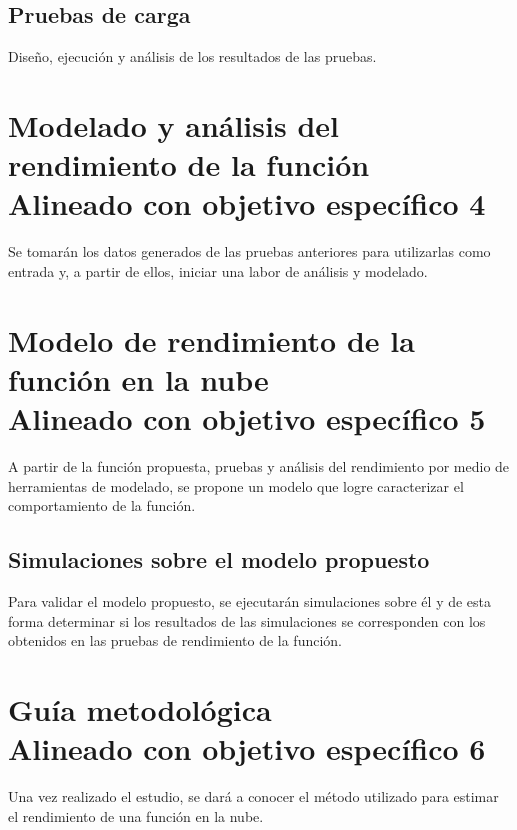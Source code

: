 \subsection{Pruebas de carga}
Diseño, ejecución y análisis de los resultados de las pruebas.




\section[Modelado y análisis del rendimiento de la función]{Modelado y análisis del rendimiento de la función\\\small{Alineado con objetivo específico 4}}
Se tomarán los datos generados de las pruebas anteriores para utilizarlas como entrada y, a partir de ellos, iniciar una labor de análisis y modelado.

\section[Modelo de rendimiento de la función en la nube]{Modelo de rendimiento de la función en la nube\\\small{Alineado con objetivo específico 5}}
A partir de la función propuesta, pruebas y análisis del rendimiento por medio de herramientas de modelado, se propone un modelo que logre caracterizar el comportamiento de la función.

\subsection[Simulaciones sobre el modelo propuesto]{Simulaciones sobre el modelo propuesto}
Para validar el modelo propuesto, se ejecutarán simulaciones sobre él y de esta forma determinar si los resultados de las simulaciones se corresponden con los obtenidos en las pruebas de rendimiento de la función.

\section[Guía metodológica]{Guía metodológica\\\small{Alineado con objetivo específico 6}}
Una vez realizado el estudio, se dará a conocer el método utilizado para estimar el rendimiento de una función en la nube. 